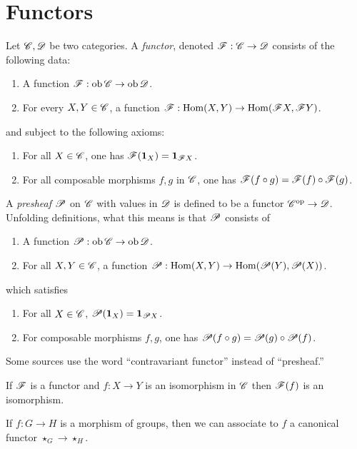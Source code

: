 \section{Functors}

Let $\mathscr{C}, \mathscr{D}$ be two categories.
A \emph{functor}, denoted $\mathscr{F} : \mathscr{C} \to \mathscr{D}$ consists of the following data:
\begin{enumerate}
  \item A function $\mathscr{F} : \operatorname{ob} \mathscr{C} \to \operatorname{ob} \mathscr{D}$.
  \item For every $X,Y \in \mathscr{C}$, a function $\mathscr{F} : \operatorname{Hom}(X,Y) \to \operatorname{Hom}(\mathscr{F} X, \mathscr{F} Y)$.
\end{enumerate}
and subject to the following axioms:
\begin{enumerate}
  \item For all $X \in \mathscr{C}$, one has $\mathscr{F}(\mathbf{1}_{X}) = \mathbf{1}_{\mathscr{F} X}$.
  \item For all composable morphisms $f,g$ in $\mathscr{C}$, one has $\mathscr{F}(f \circ g) = \mathscr{F}(f) \circ \mathscr{F}(g)$.
\end{enumerate}

A \emph{presheaf} $\mathscr{P}$ on $\mathscr{C}$ with values in $\mathscr{D}$ is defined to be a functor $\mathscr{C}^{\mathrm{op}} \to \mathscr{D}$.
Unfolding definitions, what this means is that $\mathscr{P}$ consists of
\begin{enumerate}
  \item A function $\mathscr{P} : \operatorname{ob}\mathscr{C} \to \operatorname{ob} \mathscr{D}$.
  \item For all $X,Y \in \mathscr{C}$, a function $\mathscr{P} : \operatorname{Hom}(X,Y) \to \operatorname{Hom}(\mathscr{P}(Y),\mathscr{P}(X))$.
\end{enumerate}
which satisfies
\begin{enumerate}
  \item For all $X \in \mathscr{C}$, $\mathscr{P}(\mathbf{1}_{X}) = \mathbf{1}_{\mathscr{P} X}$.
  \item For composable morphisms $f,g$, one has $\mathscr{P}(f \circ g) = \mathscr{P}(g) \circ \mathscr{P}(f)$.
\end{enumerate}
Some sources use the word ``contravariant functor'' instead of ``presheaf.''

\begin{exercise}
  If $\mathscr{F}$ is a functor and $f : X \to Y$ is an isomorphism in $\mathscr{C}$ then $\mathscr{F}(f)$ is an isomorphism.
\end{exercise}

\begin{example}
  If $f : G \to H$ is a morphism of groups, then we can associate to $f$ a canonical functor $\star_{G} \to \star_{H}$.
\end{example}

